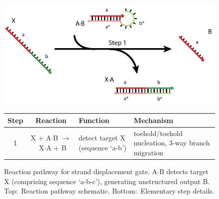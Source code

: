 \documentclass[11pt]{article}
\newcommand{\plex}{$\cdot$}
\newcommand{\unidir}{$\rightarrow$~}
\begin{document}
\clearpage

\begin{figure}
\centering
\includegraphics[]{./figs/pathway-displacement}
\bigskip
\bigskip

\begin{footnotesize}
\begin{tabular}{ccp{2.2in}p{2.3in}}
\toprule
Step & Reaction & Function  & Mechanism \\ \midrule
1 & X + A\plex B \unidir  X\plex A + B& detect target X (sequence `a-b') & toehold/toehold nucleation, 3-way branch migration\\
\bottomrule
\end{tabular}
\end{footnotesize}
\bigskip
\caption{Reaction pathway for strand displacement gate. 
A\plex B detects target X (comprising sequence `a-b-c'), generating unstructured output B. Top:~Reaction pathway schematic.  Bottom:~Elementary step details. 
\label{fig:gate-pathway}
    }
\end{figure}
\end{document}
